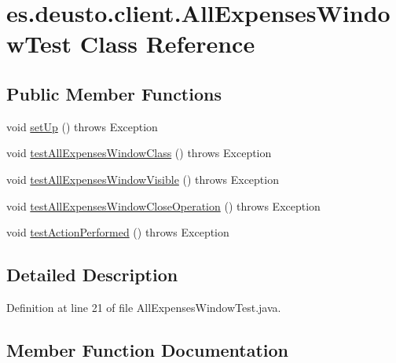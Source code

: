 \hypertarget{classes_1_1deusto_1_1client_1_1_all_expenses_window_test}{}\section{es.\+deusto.\+client.\+All\+Expenses\+Window\+Test Class Reference}
\label{classes_1_1deusto_1_1client_1_1_all_expenses_window_test}
\subsection*{Public Member Functions}
\begin{DoxyCompactItemize}
\item 
void \hyperlink{classes_1_1deusto_1_1client_1_1_all_expenses_window_test_a7bd376b520073c6d7158d57fddc81335}{set\+Up} ()  throws Exception 
\item 
void \hyperlink{classes_1_1deusto_1_1client_1_1_all_expenses_window_test_a98b52032c09251a05a32684d83810394}{test\+All\+Expenses\+Window\+Class} ()  throws Exception 
\item 
void \hyperlink{classes_1_1deusto_1_1client_1_1_all_expenses_window_test_a1eb6a11013fb12fe16453a17e050e81c}{test\+All\+Expenses\+Window\+Visible} ()  throws Exception 
\item 
void \hyperlink{classes_1_1deusto_1_1client_1_1_all_expenses_window_test_a049027a256d872c1999c6bf5f3032c4d}{test\+All\+Expenses\+Window\+Close\+Operation} ()  throws Exception 
\item 
void \hyperlink{classes_1_1deusto_1_1client_1_1_all_expenses_window_test_ae68c0cb0dc8d6e06c88306438423e44d}{test\+Action\+Performed} ()  throws Exception 
\end{DoxyCompactItemize}


\subsection{Detailed Description}


Definition at line 21 of file All\+Expenses\+Window\+Test.\+java.



\subsection{Member Function Documentation}
\mbox{\label{classes_1_1deusto_1_1client_1_1_all_expenses_window_test_a7bd376b520073c6d7158d57fddc81335}} 
